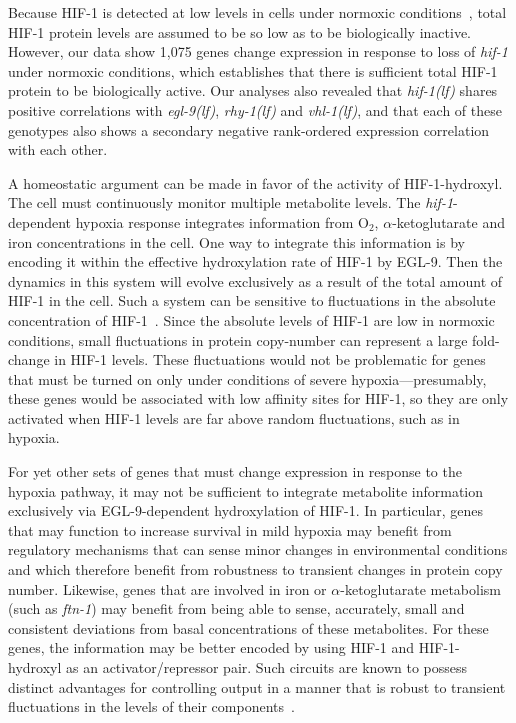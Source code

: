 \documentclass[9pt,twocolumn,twoside]{pnas-new}
\newcommand{\gene}[1]{\mbox{\emph{#1}}}
\newcommand{\ftna}{\gene{ftn-1}}
\newcommand{\egl}{\gene{egl-9(lf)}}
\newcommand{\rhy}{\gene{rhy-1(lf)}}
\newcommand{\vhl}{\gene{vhl-1(lf)}}
\newcommand{\hif}{\gene{hif-1(lf)}}
\newcommand{\eglp}{EGL-9}
\newcommand{\hifp}{HIF-1}
\newcommand{\hifn}{1,075}
\begin{document}
Because \hifp{} is detected at low levels in cells under normoxic
conditions~\cite{Wang1993}, total \hifp{} protein levels are assumed to be so
low as to be biologically inactive. However, our data show \hifn{} genes change
expression in response to loss of \gene{hif-1} under normoxic conditions, which
establishes that there is sufficient total \hifp{} protein to be biologically
active. Our analyses also revealed that \hif{} shares positive correlations with
\egl{}, \rhy{} and \vhl{}, and that each of these genotypes also shows a
secondary negative rank-ordered expression correlation with each other.


A homeostatic argument can be made in favor of the activity of \hifp{}-hydroxyl.
The cell must continuously monitor multiple metabolite levels. The
\gene{hif-1}-dependent hypoxia response integrates information from O$_2$,
$\alpha$-ketoglutarate and iron concentrations in the cell. One
way to integrate this information is by encoding it within the effective
hydroxylation rate of \hifp{} by \eglp{}. Then the dynamics in this system will
evolve exclusively as a result of the total amount of \hifp{} in the cell. Such
a system can be sensitive to fluctuations in the absolute concentration of
\hifp{}~\cite{Goentoro2009a}. Since the absolute levels of \hifp{} are low in
normoxic conditions, small fluctuations in protein copy-number can represent a
large fold-change in \hifp{} levels. These fluctuations would not be problematic
for genes that must be turned on only under conditions of severe
hypoxia---presumably, these genes would be associated with low affinity sites
for \hifp{}, so they are only activated when \hifp{} levels are far above
random fluctuations, such as in hypoxia.

For yet other sets of genes that must change expression in response to the
hypoxia pathway, it may not be sufficient to integrate metabolite
information exclusively via \eglp{}-dependent hydroxylation of \hifp{}. In
particular, genes that may function to increase survival in mild hypoxia may
benefit from regulatory mechanisms that can sense minor changes in environmental
conditions and which therefore benefit from robustness to transient changes in
protein copy number. Likewise, genes that are involved in iron or
$\alpha$-ketoglutarate metabolism (such as \ftna{}) may benefit from being able
to sense, accurately, small and consistent deviations from basal concentrations
of these metabolites. For these genes, the information may be better encoded by
using \hifp{} and \hifp{}-hydroxyl as an activator/repressor pair. Such circuits
are known to possess distinct advantages for controlling output in a manner that
is robust to transient fluctuations in the levels of their
components~\cite{Hart2012,Hart2013}.
\end{document}
